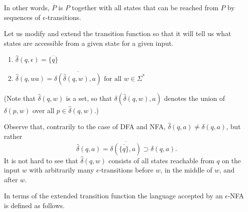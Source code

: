 In other words, $\overline{P}$ is $P$ together with all states that can be reached from $P$ by sequences of $\epsilon$-transitions.

Let us modify and extend the transition function so that it will tell us what states are accessible from a given state
for a given input.
\begin{enumerate}
\item
$\widehat{\delta}(q, \epsilon) = \overline{\{q\}}$
\item
$\widehat{\delta}(q, wa) = \overline{\delta(\widehat{\delta}(q,w), a)} \text{ for all }w \in \Sigma^*$
\end{enumerate}
(Note that $\widehat\delta(q,w)$ is a set, so that $\delta(\widehat{\delta}(q,w), a)$ denotes
the union of $\delta(p,w)$ over all $p \in \widehat{\delta}(q,w)$.)

Observe that, contrarily to the case of DFA and NFA, $\widehat{\delta}(q,a) \ne \delta(q,a)$, but rather
\[
\widehat{\delta}(q,a) = \overline{\delta(\overline{\{q\}}, a)} \supset \delta(q,a).
\]
It is not hard to see that $\widehat{\delta}(q,w)$ consists of all states reachable from $q$ on the input $w$
with arbitrarily many $\epsilon$-transitions before $w$, in the middle of $w$, and after $w$.

In terms of the extended transition function the language accepted by an $\epsilon$-NFA is defined as follows.